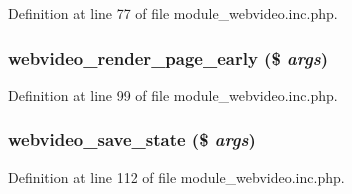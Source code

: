 Definition at line 77 of file module\_\-webvideo.inc.php.

\hypertarget{module__webvideo_8inc_8php_a347f107ab60e260a4fa7807291c67867}{
\subsubsection[{webvideo\_\-render\_\-page\_\-early}]{\setlength{\rightskip}{0pt plus 5cm}webvideo\_\-render\_\-page\_\-early (\$ {\em args})}}
\label{module__webvideo_8inc_8php_a347f107ab60e260a4fa7807291c67867}


Definition at line 99 of file module\_\-webvideo.inc.php.

\hypertarget{module__webvideo_8inc_8php_ab1ecc6e1e1827b95191ee72f4cddef3d}{
\subsubsection[{webvideo\_\-save\_\-state}]{\setlength{\rightskip}{0pt plus 5cm}webvideo\_\-save\_\-state (\$ {\em args})}}
\label{module__webvideo_8inc_8php_ab1ecc6e1e1827b95191ee72f4cddef3d}


Definition at line 112 of file module\_\-webvideo.inc.php.

